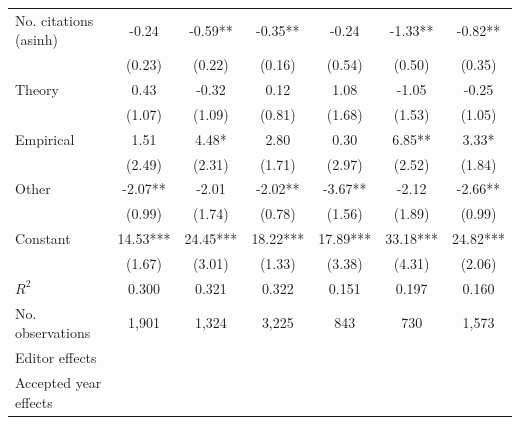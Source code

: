 \begin{table}
\begin{threeparttable}
\begin{tabular}{p{3.78cm}S@{}S@{}S@{}S@{}S@{}S@{}}
            No. citations (asinh)         &       -0.24   &       -0.59** &       -0.35** &       -0.24   &       -1.33** &       -0.82** \\
                                          &      (0.23)   &      (0.22)   &      (0.16)   &      (0.54)   &      (0.50)   &      (0.35)   \\
            Theory                        &        0.43   &       -0.32   &        0.12   &        1.08   &       -1.05   &       -0.25   \\
                                          &      (1.07)   &      (1.09)   &      (0.81)   &      (1.68)   &      (1.53)   &      (1.05)   \\
            Empirical                     &        1.51   &        4.48*  &        2.80   &        0.30   &        6.85** &        3.33*  \\
                                          &      (2.49)   &      (2.31)   &      (1.71)   &      (2.97)   &      (2.52)   &      (1.84)   \\
            Other                         &       -2.07** &       -2.01   &       -2.02** &       -3.67** &       -2.12   &       -2.66** \\
                                          &      (0.99)   &      (1.74)   &      (0.78)   &      (1.56)   &      (1.89)   &      (0.99)   \\
            Constant                      &       14.53***&       24.45***&       18.22***&       17.89***&       33.18***&       24.82***\\
                                          &      (1.67)   &      (3.01)   &      (1.33)   &      (3.38)   &      (4.31)   &      (2.06)   \\
            \midrule
            \(R^2\)                       &       0.300   &       0.321   &       0.322   &       0.151   &       0.197   &       0.160   \\
            No. observations              &       1,901   &       1,324   &       3,225   &         843   &         730   &       1,573   \\
            \midrule
            Editor effects        &           {}   &           {}   &           {}   &           {}   &           {}   &           {}   \\
            Accepted year effects         &           {}   &           {}   &               &           {}   &           {}   &               \\

\end{tabular}
\end{threeparttable}
\end{table}
